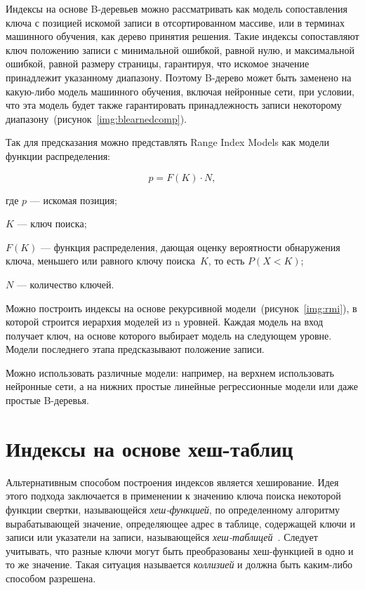 Индексы на основе B-деревьев можно рассматривать как модель сопоставления ключа
с позицией искомой записи в отсортированном массиве, или в терминах машинного
обучения, как дерево принятия решения. Такие индексы сопоставляют ключ положению
записи с минимальной ошибкой, равной нулю, и максимальной ошибкой, равной
размеру страницы, гарантируя, что искомое значение принадлежит указанному
диапазону. Поэтому B-дерево может быть заменено на какую-либо модель машинного
обучения, включая нейронные сети, при условии, что эта модель будет также
гарантировать принадлежность записи некоторому
диапазону~(рисунок~\ref{img:blearnedcomp}).


Так для предсказания можно представлять Range Index Models как модели функции
распределения:

\begin{equation}
    p = F(K) \cdot N,
\end{equation}

где $p$ --- искомая позиция;

$K$ --- ключ поиска;

$F(K)$ --- функция распределения, дающая оценку вероятности обнаружения
ключа, меньшего или равного ключу поиска~$K$, то есть $P(X < K)$;

$N$ --- количество ключей.

Можно построить индексы на основе рекурсивной
модели~(рисунок~\ref{img:rmi}), в которой строится иерархия моделей из n
уровней. Каждая модель на вход получает ключ, на основе которого выбирает модель
на следующем уровне. Модели последнего этапа предсказывают положение записи.


Можно использовать различные модели: например, на верхнем использовать нейронные
сети, а на нижних простые линейные регрессионные модели или даже простые
B-деревья.

\section{Индексы на основе хеш-таблиц}

Альтернативным способом построения индексов является хеширование. Идея этого
подхода заключается в применении к значению ключа поиска некоторой функции
свертки, называющейся \textit{хеш-функцией}, по определенному алгоритму вырабатывающей
значение, определяющее адрес в таблице, содержащей ключи и записи или указатели
на записи, называющейся \textit{хеш-таблицей}~\cite{osip}. Следует учитывать,
что разные ключи могут быть преобразованы хеш-функцией в одно и то же значение.
Такая ситуация называется \textit{коллизией} и должна быть каким-либо способом
разрешена.

